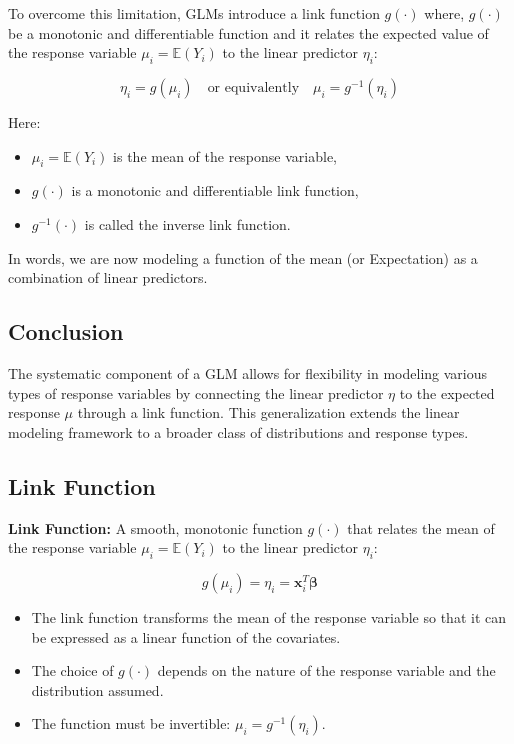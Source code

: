 \documentclass[12pt,a4paper]{article}
\begin{document}
To overcome this limitation, GLMs introduce a link function \( g(\cdot) \) where, \( g(\cdot) \) be a monotonic and differentiable function and it relates the expected value of the response variable \( \mu_i = \mathbb{E}(Y_i) \) to the linear predictor \( \eta_i \):

\[
\eta_i = g(\mu_i)
\quad \text{or equivalently} \quad
\mu_i = g^{-1}(\eta_i)
\]

Here:
\begin{itemize}
  \item \( \mu_i = \mathbb{E}(Y_i) \) is the mean of the response variable,
  \item \( g(\cdot) \) is a monotonic and differentiable link function,
  \item \( g^{-1}(\cdot) \) is called the inverse link function.
\end{itemize}

In words, we are now modeling a function of the mean (or Expectation) as a combination of
linear predictors.



\subsection*{Conclusion}

The systematic component of a GLM allows for flexibility in modeling various types of response variables by connecting the linear predictor \( \eta \) to the expected response \( \mu \) through a link function. This generalization extends the linear modeling framework to a broader class of distributions and response types.



 \subsection{Link Function}
 \textbf{Link Function:} A smooth, monotonic function \( g(\cdot) \) that relates the mean of the response variable \( \mu_i = \mathbb{E}(Y_i) \) to the linear predictor \( \eta_i \):

  \[
  g(\mu_i) = \eta_i = \mathbf{x}_i^T \boldsymbol{\beta}
  \]

  \begin{itemize}
    \item The link function transforms the mean of the response variable so that it can be expressed as a linear function of the covariates.
    \item The choice of \( g(\cdot) \) depends on the nature of the response variable and the distribution assumed.
    \item The function must be invertible: \( \mu_i = g^{-1}(\eta_i) \).
  \end{itemize}
\end{document}
